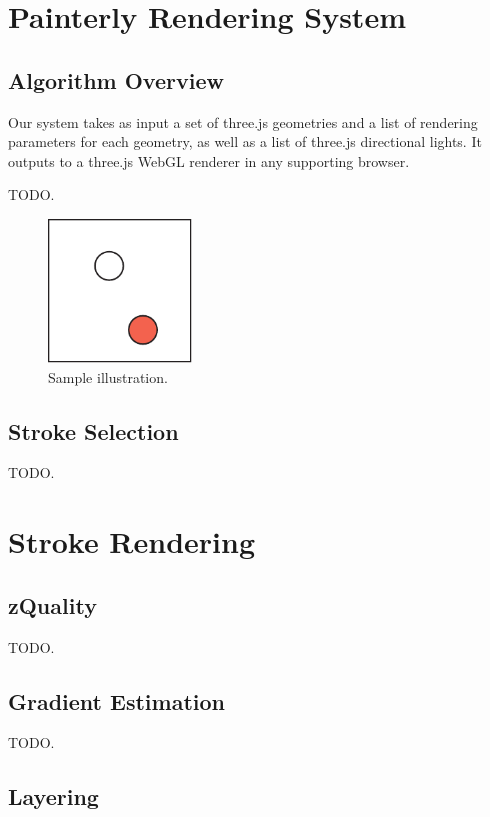 \documentclass[conference]{acmsiggraph}
\begin{document}
\section{Painterly Rendering System}

\subsection{Algorithm Overview}

Our system takes as input a set of three.js geometries and a list of rendering
parameters for each geometry, as well as a list of three.js directional lights.
It outputs to a three.js WebGL renderer in any supporting browser.

TODO.

\begin{figure}[ht]
  \centering
  \includegraphics[width=1.5in]{images/samplefigure}
  \caption{Sample illustration.}
\end{figure}

\subsection{Stroke Selection}

TODO.

\section{Stroke Rendering}

\subsection{zQuality}

TODO.

\subsection{Gradient Estimation}

TODO.

\subsection{Layering}
\end{document}
